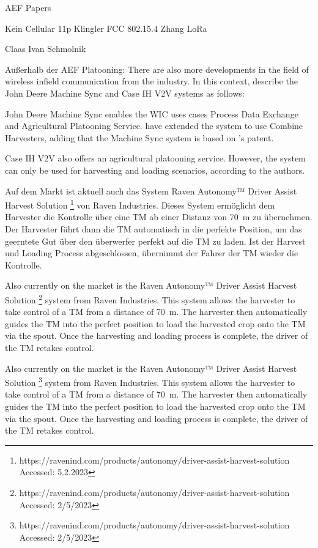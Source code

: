 \documentclass[]{nsm-thesis}
\begin{document}
AEF Papers

Kein Cellular
11p Klingler
FCC
802.15.4 Zhang
LoRa


Claas Ivan Schmolnik






Außerhalb der AEF Platooning:
There are also more developments in the field of wireless infield communication from the industry. In this context, \textcite{thomasson_review_2018} describe the John Deere Machine Sync and Case IH V2V systems as follows:

John Deere Machine Sync enables the \ac{WIC} uses cases Process Data Exchange and Agricultural Platooning Service. \textcite{liu_automation_2022} have extended the system to use Combine Harvesters, adding that the Machine Sync system is based on \textcite{metzler_system_2006}'s patent.

Case IH V2V also offers an agricultural platooning service. However, the system can only be used for harvesting and loading scenarios, according to the authors.

Auf dem Markt ist aktuell auch das System Raven Autonomy™ Driver Assist Harvest Solution \footnote{https://ravenind.com/products/autonomy/driver-assist-harvest-solution Accessed: 5.2.2023} von Raven Industries. Dieses System ermöglicht dem Harvester die Kontrolle über eine \ac{TM} ab einer Distanz von \SI{70}{\metre} zu übernehmen. Der Harvester führt dann die \ac{TM} automatisch in die perfekte Position, um das geerntete Gut über den überwerfer perfekt auf die \ac{TM} zu laden. Ist der Harvest und Loading Process abgeschlossen, übernimmt der Fahrer der \ac{TM} wieder die Kontrolle. 

Also currently on the market is the Raven Autonomy™ Driver Assist Harvest Solution \footnote{https://ravenind.com/products/autonomy/driver-assist-harvest-solution Accessed: 2/5/2023} system from Raven Industries. This system allows the harvester to take control of a \ac{TM} from a distance of \SI{70}{\metre}. The harvester then automatically guides the \ac{TM} into the perfect position to load the harvested crop onto the \ac{TM} via the spout. Once the harvesting and loading process is complete, the driver of the \ac{TM} retakes control.
	
Also currently on the market is the Raven Autonomy™ Driver Assist Harvest Solution \footnote{https://ravenind.com/products/autonomy/driver-assist-harvest-solution Accessed: 2/5/2023} system from Raven Industries. This system allows the harvester to take control of a \ac{TM} from a distance of \SI{70}{\metre}. The harvester then automatically guides the \ac{TM} into the perfect position to load the harvested crop onto the \ac{TM} via the spout. Once the harvesting and loading process is complete, the driver of the \ac{TM} retakes control. 
\end{document}
